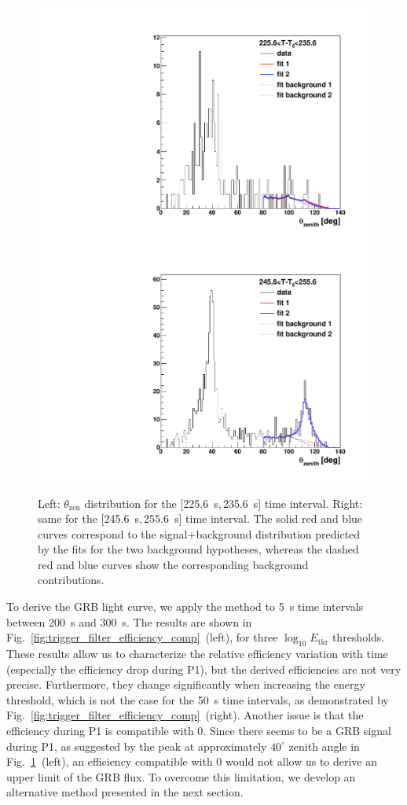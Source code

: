 \documentclass[preprint]{aastex631}
\begin{document}
\begin{figure}[t]
    \centering    
    \includegraphics[width=0.45\linewidth]{paper2_analibtemplate_logemin_1p60_225p61_235p61_sc1.pdf}
    \includegraphics[width=0.45\linewidth]{paper2_analibtemplate_logemin_1p60_245p61_255p61_sc1.pdf}
    \caption{Left: $\theta_\mathrm{zen}$ distribution for the [225.6~s,\,235.6~s] time interval. Right: same for the [245.6~s,\,255.6~s] time interval. The solid red and blue curves correspond to the signal+background distribution predicted by the fits for the two background hypotheses, whereas the dashed red and blue curves show the corresponding background contributions. }
    \label{fig:trigger_filter_efficiency_P1IPP2}
\end{figure}

To derive the GRB light curve, we apply the  method to 5~s time intervals between 200~s and 300~s. The results are shown in Fig.~\ref{fig:trigger_filter_efficiency_comp}~(left), for three $\log_{10}E_\mathrm{tkr}$ thresholds. These results allow us to characterize the relative efficiency variation with time (especially the efficiency drop during P1), but the derived efficiencies are not very precise. Furthermore, they change significantly when increasing the energy threshold, which is not the case for the 50~s time intervals, as demonstrated by Fig.~\ref{fig:trigger_filter_efficiency_comp}~(right). Another issue is that the efficiency during P1 is compatible with 0. Since there seems to be a GRB signal during P1, as suggested by the peak at approximately $40^\circ$ zenith angle in Fig.~\ref{fig:trigger_filter_efficiency_P1IPP2}~(left), an efficiency compatible with 0 would not allow us to derive an upper limit of the GRB flux. To overcome this limitation, we develop an alternative method presented in the next section.
\end{document}
